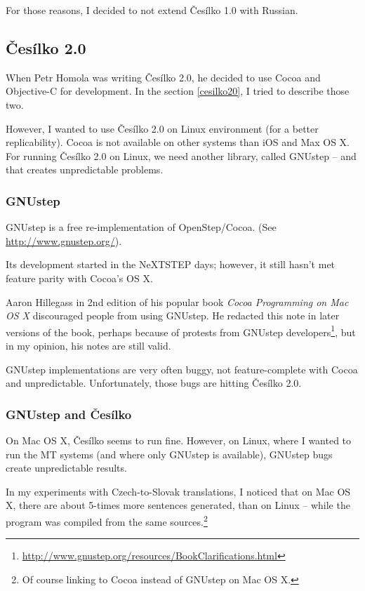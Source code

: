 For those reasons, I decided to not extend Česílko 1.0 with Russian.

\subsection{Česílko 2.0}

When Petr Homola was writing Česílko 2.0, he decided to use Cocoa and Objective-C for development. In the section \ref{cesilko20}, I tried to describe those two.

However, I wanted to use Česílko 2.0 on Linux environment (for a better replicability). Cocoa is not available on other systems than iOS and Max OS X. For running Česílko 2.0 on Linux, we need another library, called GNUstep -- and that creates unpredictable problems.

\subsubsection{GNUstep}
GNUstep is a free re-implementation of OpenStep/Cocoa. (See \url{http://www.gnustep.org/}).

Its development started in the NeXTSTEP days; however, it still hasn't met feature parity with Cocoa's OS X.

Aaron Hillegass in 2nd edition of his popular book \emph{Cocoa Programming on Mac OS X} discouraged people from using GNUstep. He redacted this note in later versions of the book, perhaps because of protests from GNUstep developers\footnote{\url{http://www.gnustep.org/resources/BookClarifications.html}}, but in my opinion, his notes are still valid.

GNUstep implementations are very often buggy, not feature-complete with Cocoa and unpredictable. Unfortunately, those bugs are hitting Česílko 2.0.

\subsubsection{GNUstep and Česílko}

On Mac OS X, Česílko seems to run fine.
However, on Linux, where I wanted to run the MT systems (and where only GNUstep is available), GNUstep bugs create unpredictable results.

In my experiments with Czech-to-Slovak translations, I noticed that on Mac OS X, there are about 5-times more sentences generated, than on Linux -- while the program was compiled from the same sources.\footnote{Of course linking to Cocoa instead of GNUstep on Mac OS X.}

